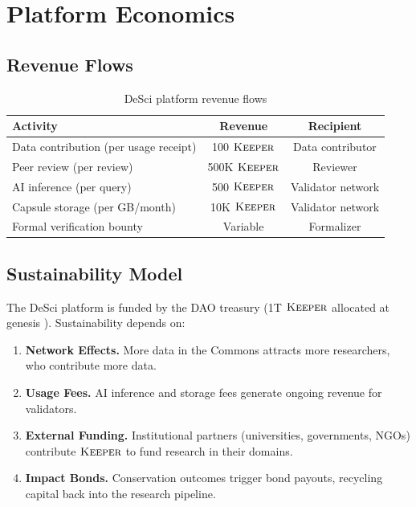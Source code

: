 \documentclass[11pt,letterpaper]{article}
\theoremstyle{definition}
\theoremstyle{remark}
\newcommand{\KEEPER}{\textsc{Keeper}}
\newcommand{\DAO}{\textsc{DAO}}
\begin{document}
\section{Platform Economics}
\label{sec:economics}

\subsection{Revenue Flows}

\begin{table}[h]
\centering
\begin{tabular}{lcc}
\toprule
\textbf{Activity} & \textbf{Revenue} & \textbf{Recipient} \\
\midrule
Data contribution (per usage receipt) & 100 $\KEEPER$ & Data contributor \\
Peer review (per review) & 500K $\KEEPER$ & Reviewer \\
AI inference (per query) & 500 $\KEEPER$ & Validator network \\
Capsule storage (per GB/month) & 10K $\KEEPER$ & Validator network \\
Formal verification bounty & Variable & Formalizer \\
\bottomrule
\end{tabular}
\caption{DeSci platform revenue flows}
\label{tab:revenue}
\end{table}

\subsection{Sustainability Model}

The DeSci platform is funded by the \DAO{} treasury (1T $\KEEPER$ allocated at genesis \cite{zoo-tokenomics}). Sustainability depends on:

\begin{enumerate}
    \item \textbf{Network Effects.} More data in the Commons attracts more researchers, who contribute more data.
    \item \textbf{Usage Fees.} AI inference and storage fees generate ongoing revenue for validators.
    \item \textbf{External Funding.} Institutional partners (universities, governments, NGOs) contribute $\KEEPER$ to fund research in their domains.
    \item \textbf{Impact Bonds.} Conservation outcomes trigger bond payouts, recycling capital back into the research pipeline.
\end{enumerate}
\end{document}
